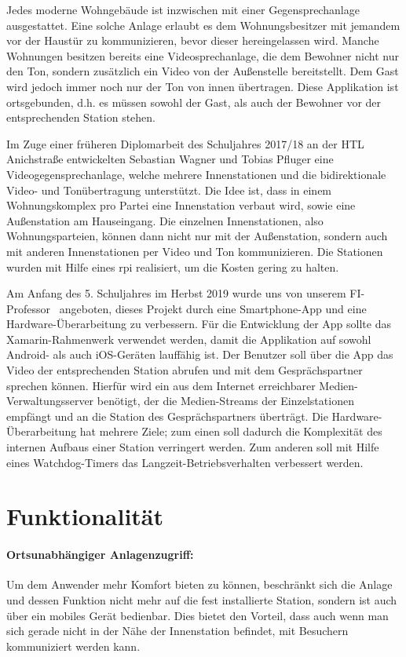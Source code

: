 Jedes moderne Wohngebäude ist inzwischen mit einer Gegensprechanlage ausgestattet.
Eine solche Anlage erlaubt es dem Wohnungsbesitzer mit jemandem vor der Haustür zu kommunizieren, bevor dieser hereingelassen wird.
Manche Wohnungen besitzen bereits eine Videosprechanlage, die dem Bewohner nicht nur den Ton, sondern zusätzlich ein Video von der Außenstelle bereitstellt.
Dem Gast wird jedoch immer noch nur der Ton von innen übertragen.
Diese Applikation ist ortsgebunden, d.h. es müssen sowohl der Gast, als auch der Bewohner vor der entsprechenden Station stehen.\par

Im Zuge einer früheren Diplomarbeit des Schuljahres 2017/18 an der HTL Anichstraße entwickelten Sebastian Wagner und Tobias Pfluger eine Videogegensprechanlage, welche mehrere Innenstationen und die bidirektionale Video- und Tonübertragung unterstützt.
Die Idee ist, dass in einem Wohnungskomplex pro Partei eine Innenstation verbaut wird, sowie eine Außenstation am Hauseingang.
Die einzelnen Innenstationen, also Wohnungsparteien, können dann nicht nur mit der Außenstation, sondern auch mit anderen Innenstationen per Video und Ton kommunizieren.
Die Stationen wurden mit Hilfe eines \ac{rpi} realisiert, um die Kosten gering zu halten.\par

Am Anfang des 5. Schuljahres im Herbst 2019 wurde uns von unserem FI-Professor \MarioPrantl\ angeboten, dieses Projekt durch eine Smartphone-App und eine Hardware-Überarbeitung zu verbessern.
Für die Entwicklung der App sollte das Xamarin-Rahmenwerk verwendet werden, damit die Applikation auf sowohl Android- als auch iOS-Geräten lauffähig ist. 
Der Benutzer soll über die App das Video der entsprechenden Station abrufen und mit dem Gesprächspartner sprechen können.
Hierfür wird ein aus dem Internet erreichbarer Medien-Verwaltungsserver benötigt, der die Medien-Streams der Einzelstationen empfängt und an die Station des Gesprächspartners überträgt.
Die Hardware-Überarbeitung hat mehrere Ziele; zum einen soll dadurch die Komplexität des internen Aufbaus einer Station verringert werden.
Zum anderen soll mit Hilfe eines Watchdog-Timers das Langzeit-Betriebsverhalten verbessert werden.

\section{Funktionalität}
\paragraph{Ortsunabhängiger Anlagenzugriff:}
Um dem Anwender mehr Komfort bieten zu können, beschränkt sich die Anlage und dessen Funktion nicht mehr auf die fest installierte Station, sondern ist auch über ein mobiles Gerät bedienbar.
Dies bietet den Vorteil, dass auch wenn man sich gerade nicht in der Nähe der Innenstation befindet, mit Besuchern kommuniziert werden kann.

